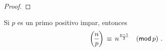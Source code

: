\begin{proof}
% 
% 
\end{proof}

\begin{lemaResiduos}\label{lema:residuos:euler}
	Si $p$ es un primo positivo impar, entonces
	\begin{displaymath}
		\legendre n p\,\equiv\,n^{\frac{p-1} 2}\modulo[p]
		\text{ .}
	\end{displaymath}
\end{lemaResiduos}

